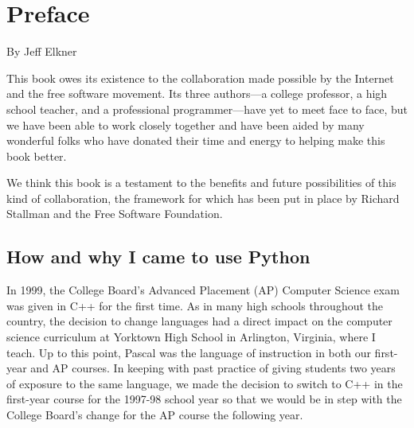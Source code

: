 

%
\chapter{Preface}

By Jeff Elkner

This book owes its existence to the collaboration made possible by the
Internet and the free software movement.  Its three authors---a
college professor, a high school teacher, and a professional
programmer---have yet to meet face to face, but we have been able to
work closely together and have been aided by many wonderful folks who
have donated their time and energy to helping make this book better.

We think this book is a testament to the benefits and future
possibilities of this kind of collaboration, the framework for which
has been put in place by Richard Stallman and the Free Software
Foundation.


\section*{How and why I came to use Python}

In 1999, the College Board's Advanced Placement (AP) Computer Science
exam was given in C++ for the first time.  As in many high schools
throughout the country, the decision to change languages had a direct
impact on the computer science curriculum at Yorktown High School in
Arlington, Virginia, where I teach.  Up to this point, Pascal was the
language of instruction in both our first-year and AP courses.  In
keeping with past practice of giving students two years of exposure to
the same language, we made the decision to switch to C++ in the
first-year course for the 1997-98 school year so that we would be in
step with the College Board's change for the AP course the following
year.


